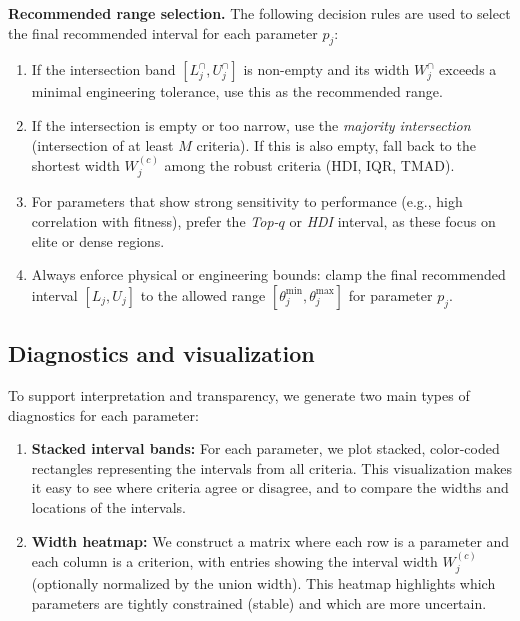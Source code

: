 \documentclass[12pt,a4paper]{article}
\begin{document}
\noindent\textbf{Recommended range selection.} The following decision rules are used to select the final recommended interval for each parameter $p_j$:
\begin{enumerate}[label=\textbf{R\arabic*}]
    \item If the intersection band $[L^{\cap}_j, U^{\cap}_j]$ is non-empty and its width $W^{\cap}_j$ exceeds a minimal engineering tolerance, use this as the recommended range.
    \item If the intersection is empty or too narrow, use the \emph{majority intersection} (intersection of at least $M$ criteria). If this is also empty, fall back to the shortest width $W^{(c)}_j$ among the robust criteria (HDI, IQR, TMAD).
    \item For parameters that show strong sensitivity to performance (e.g., high correlation with fitness), prefer the \emph{Top-$q$} or \emph{HDI} interval, as these focus on elite or dense regions.
    \item Always enforce physical or engineering bounds: clamp the final recommended interval $[L_j, U_j]$ to the allowed range $[\theta_j^{\min}, \theta_j^{\max}]$ for parameter $p_j$.
\end{enumerate}

\subsection{Diagnostics and visualization}
To support interpretation and transparency, we generate two main types of diagnostics for each parameter:
\begin{enumerate}
    \item \textbf{Stacked interval bands:} For each parameter, we plot stacked, color-coded rectangles representing the intervals from all criteria. This visualization makes it easy to see where criteria agree or disagree, and to compare the widths and locations of the intervals.
    \item \textbf{Width heatmap:} We construct a matrix where each row is a parameter and each column is a criterion, with entries showing the interval width $W^{(c)}_j$ (optionally normalized by the union width). This heatmap highlights which parameters are tightly constrained (stable) and which are more uncertain.
\end{enumerate}
\end{document}
